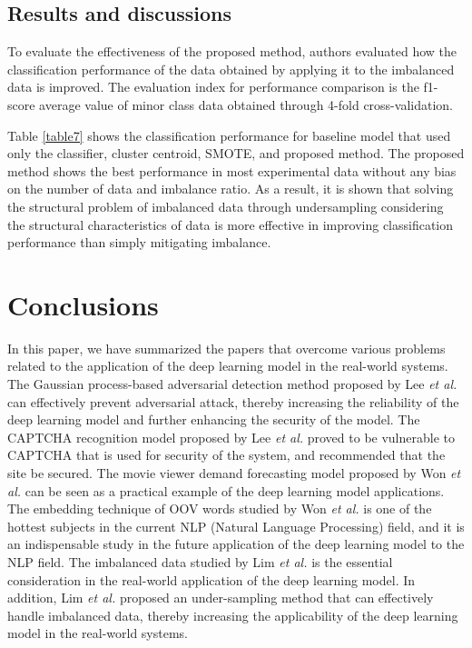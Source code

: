 \documentclass{ieeeaccess}
\begin{document}
\subsection{Results and discussions}
To evaluate the effectiveness of the proposed method, authors evaluated how the classification performance of the data obtained by applying it to the imbalanced data is improved.
The evaluation index for performance comparison is the f1-score average value of minor class data obtained through 4-fold cross-validation.

Table \ref{table7} shows the classification performance for baseline model that used only the classifier, cluster centroid, SMOTE, and proposed method.
The proposed method shows the best performance in most experimental data without any bias on the number of data and imbalance ratio.
As a result, it is shown that solving the structural problem of imbalanced data through undersampling considering the structural characteristics of data is more effective in improving classification performance than simply mitigating imbalance.


\section{Conclusions}
In this paper, we have summarized the papers that overcome various problems related to the application of the deep learning model in the real-world systems.
The Gaussian process-based adversarial detection method proposed by Lee \textit{et al.} can effectively prevent adversarial attack, thereby increasing the reliability of the deep learning model and further enhancing the security of the model.
The CAPTCHA recognition model proposed by Lee \textit{et al.} proved to be vulnerable to CAPTCHA that is used for security of the system, and recommended that the site be secured.
The movie viewer demand forecasting model proposed by Won \textit{et al.} can be seen as a practical example of the deep learning model applications.
The embedding technique of OOV words studied by Won \textit{et al.} is one of the hottest subjects in the current NLP (Natural Language Processing) field, and it is an indispensable study in the future application of the deep learning model to the NLP field.
The imbalanced data studied by Lim \textit{et al.} is the essential consideration in the real-world application of the deep learning model.
In addition, Lim \textit{et al.} proposed an under-sampling method that can effectively handle imbalanced data, thereby increasing the applicability of the deep learning model in the real-world systems.
\end{document}
